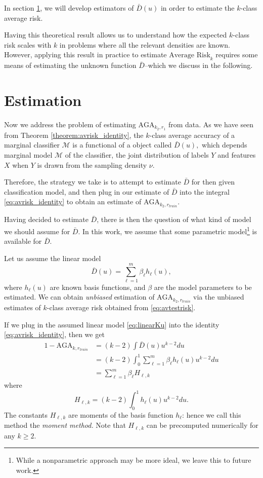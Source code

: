 In section \ref{sec:extrapolation_estimation}, we will develop
estimators of $\bar{D}(u)$ in order to estimate the $k$-class average
risk.

Having this theoretical result allows us to understand how the
expected $k$-class risk scales with $k$ in problems where all the
relevant densities are known.  However, applying this result in
practice to estimate $\text{Average Risk}_k$ requires some means of
estimating the unknown function $\bar{D}$--which we discuss in the
following.

\section{Estimation}\label{sec:extrapolation_estimation}

Now we address the problem of estimating $\text{AGA}_{k_2, r_1}$ from
data.  As we have seen from Theorem \ref{theorem:avrisk_identity}, the
$k$-class average accuracy of a marginal classifier $\mathcal{M}$ is a
functional of a object called $\bar{D}(u),$ which depends marginal
model $\mathcal{M}$ of the classifier, the joint distribution of
labels $Y$ and features $X$ when $Y$ is drawn from the sampling
density $\nu$.

Therefore, the strategy we take is to attempt to estimate $\bar{D}$
for then given classification model, and then plug in our estimate of
$\bar{D}$ into the integral \eqref{eq:avrisk_identity} to obtain an
estimate of $\text{AGA}_{k_2, r_{train}}$.

Having decided to estimate $\bar{D}$, there is then the question of
what kind of model we should assume for $\bar{D}$.  In this work, we
assume that some parametric model\footnote{While a
nonparametric approach may be more ideal, we leave this to future work.} is available for $\bar{D}$.

Let us assume the linear model
\begin{equation}\label{eq:linearKu}
\bar{D}(u) = \sum_{\ell = 1}^m \beta_\ell h_\ell(u),
\end{equation}
where $h_\ell(u)$ are known basis functions, and $\beta$ are the model
parameters to be estimated. We can obtain \emph{unbiased} estimation
of $\text{AGA}_{k_2, r_{train}}$ via the unbiased estimates of
$k$-class average risk obtained from \eqref{eq:avtestrisk}.

If we plug in the assumed linear model \eqref{eq:linearKu} into the
identity \eqref{eq:avrisk_identity}, then we get
\begin{align}
1 - \text{AGA}_{k, r_{train}} &= (k-2)\int \bar{D}(u) u^{k-2} du
\\&= (k-2)\int_0^1 \sum_{\ell = 1}^m \beta_\ell h_\ell(u) u^{k-2} du
\\&= \sum_{\ell = 1}^m \beta_\ell H_{\ell,k} \label{eq:avrisk_linear}
\end{align}
where
\begin{equation}
H_{\ell,k} = (k-2) \int_0^1 h_\ell(u) u^{k-2} du.
\end{equation}
The constants $H_{\ell, k}$ are moments of the basis function
$h_\ell$: hence we call this method the \emph{moment method.}  Note
that $H_{\ell, k}$ can be precomputed numerically for any $k \geq 2$.


